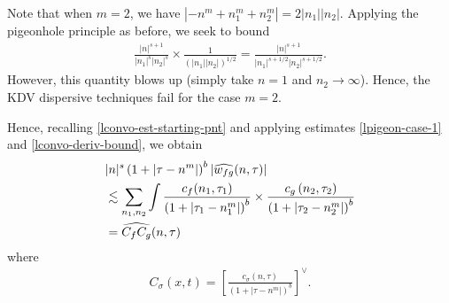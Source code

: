 %
%
\begin{remark}
	Note that when $m=2$, we have $|-n^{m} + n_{1}^{m} + n_{2}^{m}| = 2| n_1 |
	|n_2|$. Applying the pigeonhole principle as before, we seek to bound 
	\begin{equation*}
		\begin{split}
			\frac{| n |^{s+1}}{| n_1 |^s |n_2|^s} \times \frac{1}{(| n_1 | |n_2
			|)^{1/2}} = \frac{| n |^{s+1}}{|n_{1}|^{s + 1/2}| n_2 |^{s+1/2}}.
		\end{split}
	\end{equation*}
	However, this quantity blows up (simply take $n=1$ and $n_2 \to \infty$).
	Hence, the KDV dispersive techniques fail for the case $m=2$. 
\end{remark}
%
Hence, recalling \eqref{lconvo-est-starting-pnt} and applying estimates 
\eqref{lpigeon-case-1} and \eqref{lconvo-deriv-bound}, we obtain
%
%
\begin{equation}
	\label{lnon-lin-rep-with-bound}
	\begin{split}
		& |n|^s \left( 1 + | \tau - n^{m } | \right)^{b} | 
		\widehat{w_{fg}}(n, \tau) | 
		\\
		& \lesssim \sum_{n_1,n_2} \int \frac{c_f(n_1, \tau_1)}{\left( 1 + | 
		\tau_1 -  n_1^{m }| \right)^{b}}
		\times \frac{c_g\left( n_2, \tau_2\right)}{\left( 1 + | \tau_2 -n_2^{m }|
		\right)^{b}}
		\\
		& = \widehat{C_f C_g}(n, \tau)
	\end{split}
\end{equation}
%
%
where
\begin{equation*}
	\begin{split}
		C_\sigma(x,t) =
		\left[ \frac{c_\sigma(n, \tau)}{\left( 1 + | \tau - n^{m } | 
		\right)^{b}}\right]^\vee .	
	\end{split}
\end{equation*}

